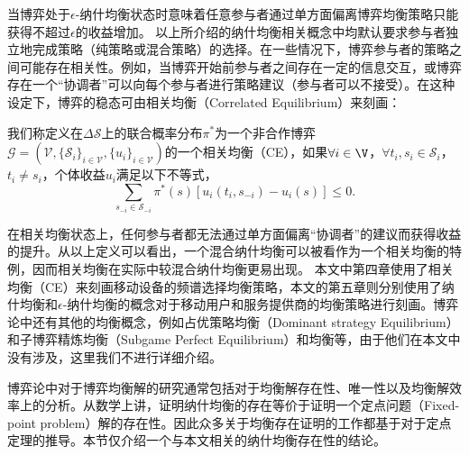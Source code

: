 当博弈处于$\epsilon$-纳什均衡状态时意味着任意参与者通过单方面偏离博弈均衡策略只能获得不超过$\epsilon$的收益增加。
以上所介绍的纳什均衡相关概念中均默认要求参与者独立地完成策略（纯策略或混合策略）的选择。在一些情况下，博弈参与者的策略之间可能存在相关性。例如，当博弈开始前参与者之间存在一定的信息交互，或博弈存在一个“协调者”可以向每个参与者进行策略建议（参与者可以不接受）。在这种设定下，博弈的稳态可由相关均衡（Correlated Equilibrium）\cite{Aumann}来刻画：
\begin{df}[相关均衡]
我们称定义在$\Delta\mathcal{S}$上的联合概率分布$\pi^*$为一个非合作博弈$\mathcal{G}=(\mathcal{V},\{\mathcal{S}_i\}_{i\in\mathcal{V}},\{u_i\}_{i\in\mathcal{V}})$的一个相关均衡（CE），如果$\forall i\in\V$，$\forall t_{i},s_i\in\mathcal{S}_i$，$t_i\neq s_i$，个体收益$u_i$满足以下不等式，
\begin{equation}
\sum_{s_{-i}\in\mathcal{S}_{-i}}\pi^*(s)\left[u_i(t_i,s_{-i})-u_i(s)\right]\leq0.
\end{equation}
\end{df}

在相关均衡状态上，任何参与者都无法通过单方面偏离“协调者”的建议而获得收益的提升。从以上定义可以看出，一个混合纳什均衡可以被看作为一个相关均衡的特例，因而相关均衡在实际中较混合纳什均衡更易出现。
本文中第四章使用了相关均衡（CE）来刻画移动设备的频谱选择均衡策略，本文的第五章则分别使用了纳什均衡和$\epsilon$-纳什均衡的概念对于移动用户和服务提供商的均衡策略进行刻画。博弈论中还有其他的均衡概念，例如占优策略均衡（Dominant strategy Equilibrium）和子博弈精炼均衡（Subgame Perfect Equilibrium）和均衡等，由于他们在本文中没有涉及，这里我们不进行详细介绍。

博弈论中对于博弈均衡解的研究通常包括对于均衡解存在性、唯一性以及均衡解效率上的分析。从数学上讲，证明纳什均衡的存在等价于证明一个定点问题（Fixed-point problem）解的存在性。因此众多关于均衡存在证明的工作都基于对于定点定理的推导。本节仅介绍一个与本文相关的纳什均衡存在性的结论\cite{Nash48}。



